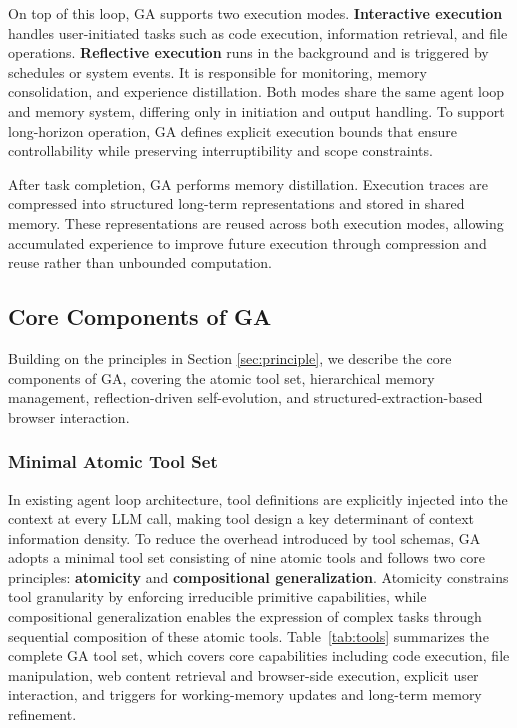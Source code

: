 On top of this loop, GA supports two execution modes. \textbf{Interactive execution} handles user-initiated tasks such as code execution, information retrieval, and file operations. \textbf{Reflective execution} runs in the background and is triggered by schedules or system events. It is responsible for monitoring, memory consolidation, and experience distillation. Both modes share the same agent loop and memory system, differing only in initiation and output handling. To support long-horizon operation, GA defines explicit execution bounds that ensure controllability while preserving interruptibility and scope constraints.

After task completion, GA performs memory distillation. Execution traces are compressed into structured long-term representations and stored in shared memory. These representations are reused across both execution modes, allowing accumulated experience to improve future execution through compression and reuse rather than unbounded computation.

\subsection{Core Components of GA}
\label{sec:core_design}
Building on the principles in Section \ref{sec:principle}, we describe the core components of GA, covering the atomic tool set, hierarchical memory management, reflection-driven self-evolution, and structured-extraction-based browser interaction.

\subsubsection{Minimal Atomic Tool Set}
\label{sec:tools}
In existing agent loop architecture, tool definitions are explicitly injected into the context at every LLM call, making tool design a key determinant of context information density. To reduce the overhead introduced by tool schemas, GA adopts a minimal tool set consisting of nine atomic tools and follows two core principles: \textbf{atomicity} and \textbf{compositional generalization}. Atomicity constrains tool granularity by enforcing irreducible primitive capabilities, while compositional generalization enables the expression of complex tasks through sequential composition of these atomic tools. Table~\ref{tab:tools} summarizes the complete GA tool set, which covers core capabilities including code execution, file manipulation, web content retrieval and browser-side execution, explicit user interaction, and triggers for working-memory updates and long-term memory refinement.

